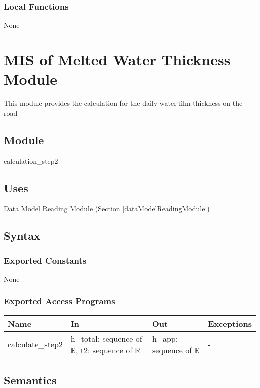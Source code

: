 \documentclass[12pt, titlepage]{article}
\begin{document}
\subsubsection{Local Functions}
None
\newpage


\section{MIS of Melted Water Thickness Module} \label{meltedWaterThicknessModule}
This module provides the calculation for the daily water film thickness on the road

\subsection{Module}
calculation\_step2

\subsection{Uses}
Data Model Reading Module (Section \ref{dataModelReadingModule})


\subsection{Syntax}

\subsubsection{Exported Constants}
None
\subsubsection{Exported Access Programs}

\begin{center}
\begin{tabular}{p{2.5cm} p{4.5cm} p{4.5cm} p{2cm}}
\hline
\textbf{Name} & \textbf{In} & \textbf{Out} & \textbf{Exceptions} \\
\hline
calculate\_step2 & h\_total: sequence of $\mathbb{R}$, t2: sequence of $\mathbb{R}$ & h\_app: sequence of $\mathbb{R}$ & - \\

\hline
\end{tabular}
\end{center}

\subsection{Semantics}
\end{document}

